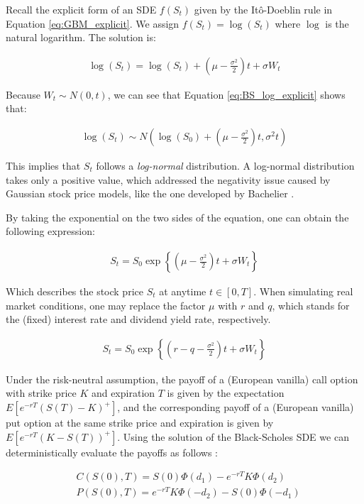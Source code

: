 Recall the explicit form of an SDE $f(S_t)$ given by the Itô-Doeblin rule in Equation \ref{eq:GBM_explicit}. We assign $f(S_t)=\log(S_t)$ where $\log$ is the natural logarithm. The solution is:

\begin{align} \label{eq:BS_log_explicit}
\log(S_t) = \log(S_t) + (\mu - \frac{\sigma^2}{2})t + \sigma W_t
\end{align}

Because $W_t\sim N(0, t)$, we can see that Equation \ref{eq:BS_log_explicit} shows that:

\begin{align*}
\log(S_t)\sim N(\log(S_0)+(\mu - \frac{\sigma^2}{2})t, \sigma^2 t)
\end{align*}

This implies that $S_t$ follows a \textit{log-normal} distribution. A log-normal distribution takes only a positive value, which addressed the negativity issue caused by Gaussian stock price models, like the one developed by Bachelier \cite{Bachelier1900}.

By taking the exponential on the two sides of the equation, one can obtain the following expression:

\begin{align} \label{eq:BS_explicit}
S_t = S_0\exp{\left\{(\mu-\frac{\sigma^2}{2})t + \sigma W_t\right\}}
\end{align}

Which describes the stock price $S_t$ at anytime $t\in[0,T]$. When simulating real market conditions, one may replace the factor $\mu$ with $r$ and $q$, which stands for the (fixed) interest rate and dividend yield rate, respectively.

\begin{align*}
S_t = S_0\exp{\left\{(r-q-\frac{\sigma^2}{2})t + \sigma W_t\right\}}
\end{align*}

Under the risk-neutral assumption, the payoff of a (European vanilla) call option with strike price $K$ and expiration $T$ is given by the expectation $E[e^{-rT}(S(T)-K)^+]$, and the corresponding payoff of a (European vanilla) put option at the same strike price and expiration is given by $E[e^{-rT}(K-S(T))^+]$. Using the solution of the Black-Scholes SDE we can deterministically evaluate the payoffs as follows \cite{Higham2004}:

\begin{align*}
&C(S(0), T) = S(0)\Phi(d_1) - e^{-rT}K\Phi(d_2) \\ 
&P(S(0), T) = e^{-rT}K\Phi(-d_2) - S(0)\Phi(-d_1)
\end{align*}

